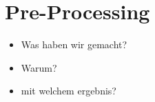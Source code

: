 \section{Pre-Processing}

\begin{itemize}
    \item Was haben wir gemacht?
    \item Warum?
    \item mit welchem ergebnis?
\end{itemize}



